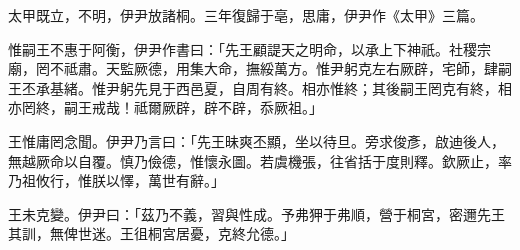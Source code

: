 
\begin{pinyinscope}
太甲既立，不明，伊尹放諸桐。三年復歸于亳，思庸，伊尹作《太甲》三篇。

惟嗣王不惠于阿衡，伊尹作書曰：「先王顧諟天之明命，以承上下神祇。社稷宗廟，罔不祗肅。天監厥德，用集大命，撫綏萬方。惟尹躬克左右厥辟，宅師，肆嗣王丕承基緒。惟尹躬先見于西邑夏，自周有終。相亦惟終；其後嗣王罔克有終，相亦罔終，嗣王戒哉！祗爾厥辟，辟不辟，忝厥祖。」

王惟庸罔念聞。伊尹乃言曰：「先王昧爽丕顯，坐以待旦。旁求俊彥，啟迪後人，無越厥命以自覆。慎乃儉德，惟懷永圖。若虞機張，往省括于度則釋。欽厥止，率乃祖攸行，惟朕以懌，萬世有辭。」

王未克變。伊尹曰：「茲乃不義，習與性成。予弗狎于弗順，營于桐宮，密邇先王其訓，無俾世迷。王徂桐宮居憂，克終允德。」


\end{pinyinscope}